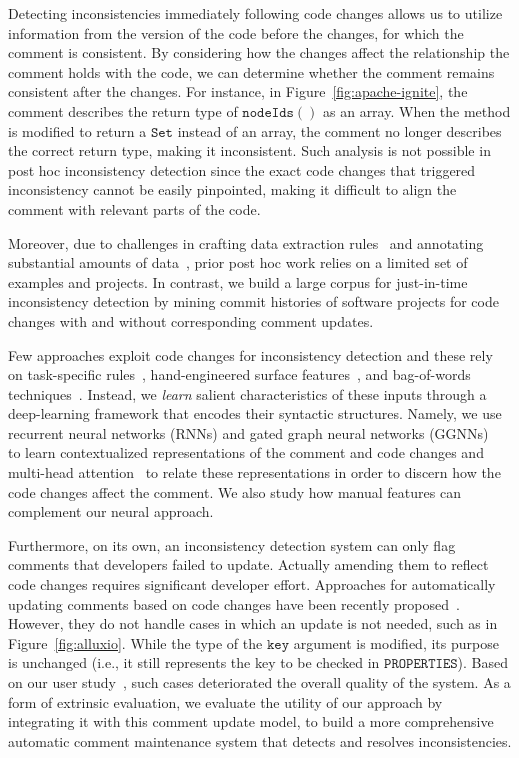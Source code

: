 \documentclass[letterpaper]{article} %
\newcommand{\CodeIn}[1]{{\ifmmode{\mathtt{#1}}\else$\mathtt{#1}$\fi}}
\newcommand{\Posthoc}{post hoc}
\newcommand{\JustInTime}{just-in-time}
\begin{document}
Detecting inconsistencies immediately following code changes allows us to utilize information from the version of the code before the changes, for which the comment is consistent. By considering how the changes affect the relationship the comment holds with the code, we can determine whether the comment remains consistent after the changes. For instance, in Figure~\ref{fig:apache-ignite}, the comment describes the return type of \CodeIn{nodeIds()} as an array. When the method is modified to return a \CodeIn{Set} instead of an array, the comment no longer describes the correct return type, making it inconsistent. Such analysis is not possible in \Posthoc{} inconsistency detection since the exact code changes that triggered inconsistency cannot be easily pinpointed, making it difficult to align the comment with relevant parts of the code.

Moreover, due to challenges in crafting  data extraction rules~\cite{icomment2007,aComment} and annotating substantial amounts of data~\cite{Corazza18}, prior \Posthoc{} work relies on a limited set of examples and projects. In contrast, we build a large corpus for \JustInTime{} inconsistency detection by mining commit histories of software projects for  code changes with and without corresponding comment updates.


Few approaches exploit code changes for inconsistency detection and these rely on task-specific rules~\cite{SaduThesis}, hand-engineered surface features~\cite{LiuOutdatedLine,Malik08}, and bag-of-words techniques~\cite{LiuOutdatedLine}.
Instead, we  \textit{learn} salient characteristics of these inputs through a deep-learning framework that encodes their syntactic structures. Namely, we use recurrent neural networks (RNNs) and gated graph neural networks (GGNNs)~\cite{Li2016GatedGS} to learn contextualized representations of the comment and code changes and multi-head attention~\cite{transformer}
to relate these representations in order to discern how the code changes affect the comment. We also study how manual features can complement our neural approach.

Furthermore, on its own,
an inconsistency detection system can only flag comments that developers failed to update. Actually amending them to reflect code changes requires significant developer effort. Approaches for automatically updating comments based on code changes have been recently proposed~\cite{panthaplackel2020update, LiuJITUpdate}. However, they do not handle cases in which an update is not needed, such as in
Figure~\ref{fig:alluxio}. While the type of the \CodeIn{key} argument is modified, its purpose is unchanged (i.e., it still represents the key to be checked in \CodeIn{PROPERTIES}). Based on our user study~\cite{panthaplackel2020update}, such cases deteriorated the overall quality of the system.
As a form of extrinsic evaluation, we evaluate the utility of our approach by integrating
it with this comment update model, to build a more comprehensive automatic comment maintenance system that detects and resolves inconsistencies.
\end{document}
